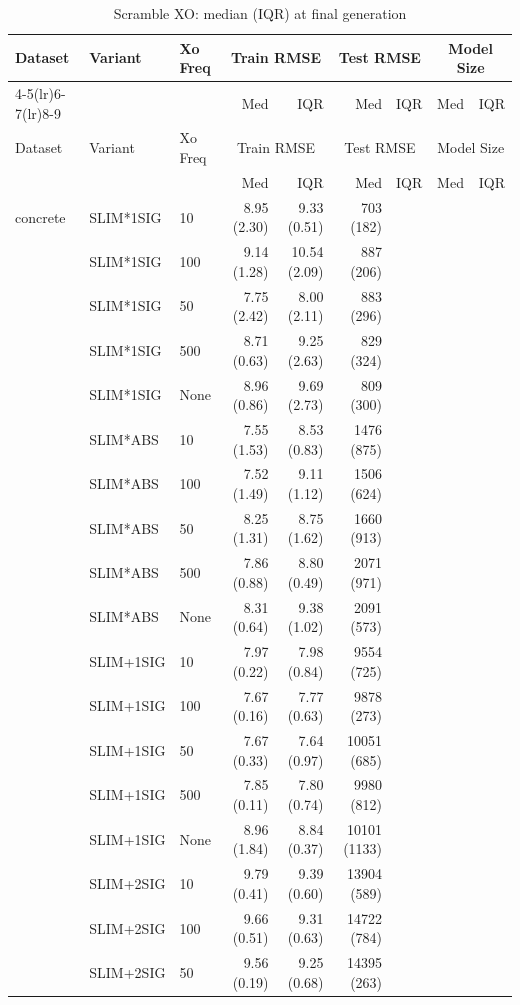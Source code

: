 \begin{longtable}{lllrrrrrr}
\caption{Scramble XO: median (IQR) at final generation} \label{tab:scramble_xo} \\
\toprule
Dataset & Variant & Xo Freq & \multicolumn{2}{c}{Train RMSE} & \multicolumn{2}{c}{Test RMSE} & \multicolumn{2}{c}{Model Size} \\
\cmidrule(lr){4-5}\cmidrule(lr){6-7}\cmidrule(lr){8-9}
 & &  & Med & IQR & Med & IQR & Med & IQR \\
\midrule
\endfirsthead
\toprule
Dataset & Variant & Xo Freq & \multicolumn{2}{c}{Train RMSE} & \multicolumn{2}{c}{Test RMSE} & \multicolumn{2}{c}{Model Size} \\
 & &  & Med & IQR & Med & IQR & Med & IQR \\
\midrule
\endhead
\bottomrule
\endfoot
concrete & SLIM*1SIG & 10 & 8.95 (2.30) & 9.33 (0.51) & 703 (182) \\
 & SLIM*1SIG & 100 & 9.14 (1.28) & 10.54 (2.09) & 887 (206) \\
 & SLIM*1SIG & 50 & 7.75 (2.42) & 8.00 (2.11) & 883 (296) \\
 & SLIM*1SIG & 500 & 8.71 (0.63) & 9.25 (2.63) & 829 (324) \\
 & SLIM*1SIG & None & 8.96 (0.86) & 9.69 (2.73) & 809 (300) \\
 & SLIM*ABS & 10 & 7.55 (1.53) & 8.53 (0.83) & 1476 (875) \\
 & SLIM*ABS & 100 & 7.52 (1.49) & 9.11 (1.12) & 1506 (624) \\
 & SLIM*ABS & 50 & 8.25 (1.31) & 8.75 (1.62) & 1660 (913) \\
 & SLIM*ABS & 500 & 7.86 (0.88) & 8.80 (0.49) & 2071 (971) \\
 & SLIM*ABS & None & 8.31 (0.64) & 9.38 (1.02) & 2091 (573) \\
 & SLIM+1SIG & 10 & 7.97 (0.22) & 7.98 (0.84) & 9554 (725) \\
 & SLIM+1SIG & 100 & 7.67 (0.16) & 7.77 (0.63) & 9878 (273) \\
 & SLIM+1SIG & 50 & 7.67 (0.33) & 7.64 (0.97) & 10051 (685) \\
 & SLIM+1SIG & 500 & 7.85 (0.11) & 7.80 (0.74) & 9980 (812) \\
 & SLIM+1SIG & None & 8.96 (1.84) & 8.84 (0.37) & 10101 (1133) \\
 & SLIM+2SIG & 10 & 9.79 (0.41) & 9.39 (0.60) & 13904 (589) \\
 & SLIM+2SIG & 100 & 9.66 (0.51) & 9.31 (0.63) & 14722 (784) \\
 & SLIM+2SIG & 50 & 9.56 (0.19) & 9.25 (0.68) & 14395 (263) \\

\end{longtable}
